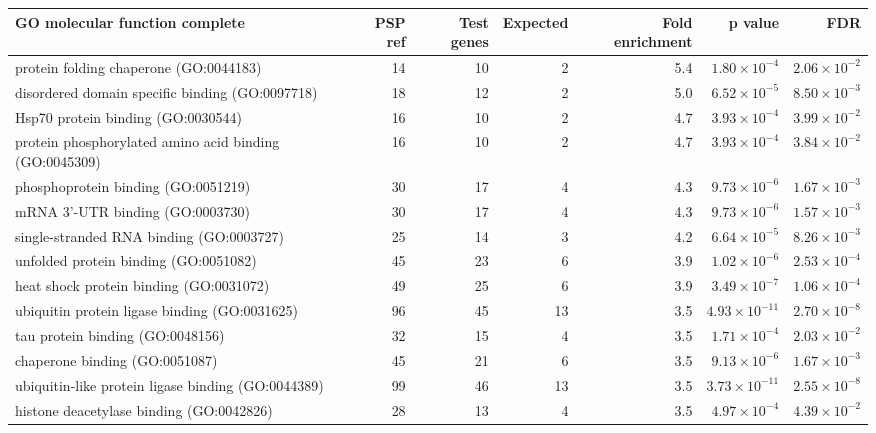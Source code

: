 \begin{table}[ht]
\centering
\begin{adjustbox}{width=\textwidth}

\begin{tabular}{lrrrrrr}
  \hline
GO molecular function complete & PSP ref & Test genes & Expected & Fold enrichment & p value & FDR \\ 
  \hline
protein folding chaperone (GO:0044183) & 14 & 10 & 2 & 5.4 & $1.80 \times 10^{-4}$ & $2.06 \times 10^{-2}$ \\ 
  disordered domain specific binding (GO:0097718) & 18 & 12 & 2 & 5.0 & $6.52 \times 10^{-5}$ & $8.50 \times 10^{-3}$ \\ 
  Hsp70 protein binding (GO:0030544) & 16 & 10 & 2 & 4.7 & $3.93 \times 10^{-4}$ & $3.99 \times 10^{-2}$ \\ 
  protein phosphorylated amino acid binding (GO:0045309) & 16 & 10 & 2 & 4.7 & $3.93 \times 10^{-4}$ & $3.84 \times 10^{-2}$ \\ 
  phosphoprotein binding (GO:0051219) & 30 & 17 & 4 & 4.3 & $9.73 \times 10^{-6}$ & $1.67 \times 10^{-3}$ \\ 
  mRNA 3'-UTR binding (GO:0003730) & 30 & 17 & 4 & 4.3 & $9.73 \times 10^{-6}$ & $1.57 \times 10^{-3}$ \\ 
  single-stranded RNA binding (GO:0003727) & 25 & 14 & 3 & 4.2 & $6.64 \times 10^{-5}$ & $8.26 \times 10^{-3}$ \\ 
  unfolded protein binding (GO:0051082) & 45 & 23 & 6 & 3.9 & $1.02 \times 10^{-6}$ & $2.53 \times 10^{-4}$ \\ 
  heat shock protein binding (GO:0031072) & 49 & 25 & 6 & 3.9 & $3.49 \times 10^{-7}$ & $1.06 \times 10^{-4}$ \\ 
  ubiquitin protein ligase binding (GO:0031625) & 96 & 45 & 13 & 3.5 & $4.93 \times 10^{-11}$ & $2.70 \times 10^{-8}$ \\ 
  tau protein binding (GO:0048156) & 32 & 15 & 4 & 3.5 & $1.71 \times 10^{-4}$ & $2.03 \times 10^{-2}$ \\ 
  chaperone binding (GO:0051087) & 45 & 21 & 6 & 3.5 & $9.13 \times 10^{-6}$ & $1.67 \times 10^{-3}$ \\ 
  ubiquitin-like protein ligase binding (GO:0044389) & 99 & 46 & 13 & 3.5 & $3.73 \times 10^{-11}$ & $2.55 \times 10^{-8}$ \\ 
  histone deacetylase binding (GO:0042826) & 28 & 13 & 4 & 3.5 & $4.97 \times 10^{-4}$ & $4.39 \times 10^{-2}$ \\ 

\end{tabular}
\end{adjustbox}
\end{table}
